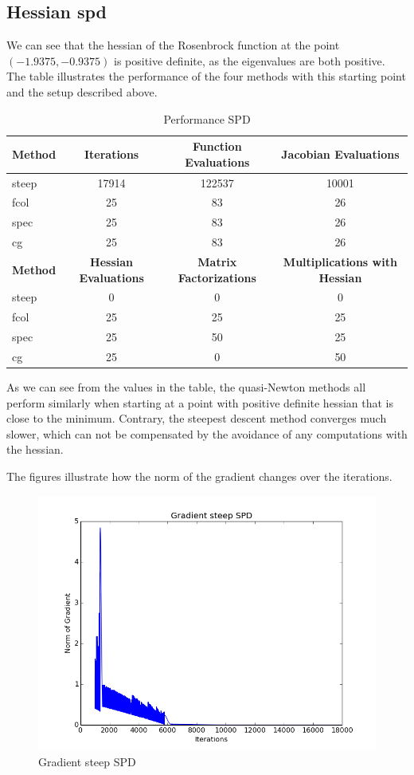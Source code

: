 \documentclass{article}
\begin{document}
\subsection{Hessian spd}
We can see that the hessian of the Rosenbrock function at the point $(-1.9375,-0.9375)$ is positive
definite, as the eigenvalues are both positive. The  table illustrates the performance
of the four methods with this starting point and the setup described above.
\begin{table}[H]
  \centering
  \begin{tabular}{|l|c|c|c|}
    \hline
   \textbf{Method} & \textbf{Iterations} & \textbf{Function Evaluations} &\textbf{Jacobian Evaluations} \\ \hline
   steep &17914 &122537 &10001 \\ \hline
   fcol &25 &83 &26 \\ \hline
   spec &25 &83 &26 \\ \hline
   cg &25 &83 &26 \\ \hline
 \textbf{Method} & \textbf{Hessian Evaluations} & \textbf{Matrix Factorizations} & \textbf{Multiplications with Hessian} \\ \hline
 steep &0 & 0 & 0 \\ \hline
   fcol &25 &25 &25 \\ \hline
   spec &25 &50 &25 \\ \hline
   cg &25 &0 &50 \\ \hline
  \end{tabular}
  \caption{Performance SPD}
  \label{tab:perform1}
\end{table}
As we can see from the values in the table, the quasi-Newton methods all perform similarly when starting at a
point with positive definite hessian that is close to the minimum. Contrary, the steepest descent method converges
much slower, which can not be compensated by the avoidance of any computations with the hessian. \par
The figures illustrate how the norm of the gradient changes over the iterations.
\begin{figure}[H]
  \centering
  \includegraphics[scale=0.5]{steepspd.png}
  \caption{Gradient steep SPD}
\end{figure}
\end{document}
